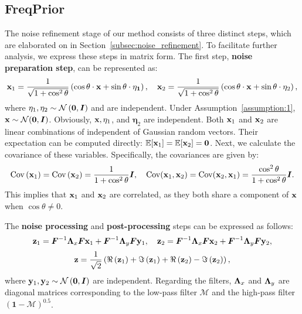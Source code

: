 \subsection{FreqPrior}
\label{appendix:freqprior}
The noise refinement stage of our method consists of three distinct steps, which are elaborated on in Section~\ref{subsec:noise_refinement}.  
To facilitate further analysis, we express these steps in matrix form.
The first step, \textbf{noise preparation step}, can be represented as:
\begin{equation}
\label{eq:freq_x1}
    \mathbf{x}_1 = \frac{1}{\sqrt{1+\cos^2\theta}}\left(\cos\theta\cdot \mathbf{x}+\sin\theta\cdot\mathbf{\eta_1}\right),\quad
    \mathbf{x}_2 = \frac{1}{\sqrt{1+\cos^2\theta}}\left(\cos\theta\cdot \mathbf{x}+\sin\theta\cdot\mathbf{\eta}_2\right),
\end{equation}
where $\mathbf\eta_1, \mathbf\eta_2\sim\mathcal{N}\left(\mathbf{0}, {\bm{I}}\right)$ and are independent. Under Assumption~\ref{assumption:1}, $\mathbf{x}\sim\mathcal{N}(\mathbf{0},{\bm{I}})$. Obviously, $\mathbf{x}, \mathbf\eta_1$, and $\mathbf\eta_2$ are independent.
Both $\mathbf{x}_1$ and $\mathbf{x}_2$ are linear combinations of independent of Gaussian random vectors. 
Their expectation can be computed directly: $\mathbb{E}[\mathbf{x}_1]=\mathbb{E}[\mathbf{x}_2]=\mathbf{0}$.
Next, we calculate the covariance of these variables. Specifically, the covariances are given by:
\begin{equation}
\label{eq:freq_x2}
    \mathrm{Cov}\left(\mathbf{x}_1\right) = \mathrm{Cov}\left(\mathbf{x}_2\right) = \frac{1}{1+\cos^2\theta}{\bm{I}},\quad
    \mathrm{Cov}(\mathbf{x}_1,\mathbf{x}_2) = \mathrm{Cov}(\mathbf{x}_2,\mathbf{x}_1) = \frac{\cos^2\theta}{1+\cos^2\theta}{\bm{I}}.
\end{equation}
This implies that $\mathbf{x}_1$ and $\mathbf{x}_2$ are correlated, as they both share a component of $\mathbf{x}$ when $\cos\theta\ne0$.

The \textbf{noise processing} and \textbf{post-processing} steps can be expressed as follows:
\begin{equation}
    \mathbf{z}_1 = {\bm{F}}^{-1}{\bm{\Lambda}}_x{\bm{F}}\mathbf{x}_1 + {\bm{F}}^{-1}{\bm{\Lambda}}_y{\bm{F}}\mathbf{y}_1, \quad
    \mathbf{z}_2 = {\bm{F}}^{-1}{\bm{\Lambda}}_x{\bm{F}}\mathbf{x}_2 + {\bm{F}}^{-1}{\bm{\Lambda}}_y{\bm{F}}\mathbf{y}_2,
\end{equation}
\begin{equation}
\mathbf{z} = \frac{1}{\sqrt{2}}\left(\Re\left(\mathbf{z}_1\right)+\Im\left(\mathbf{z}_1\right)+\Re\left(\mathbf{z}_2\right)-\Im\left(\mathbf{z}_2\right)\right),
\end{equation}
where $\mathbf{y}_1, \mathbf{y}_2\sim\mathcal{N}\left(\mathbf{0}, {\bm{I}}\right)$ are independent. 
Regarding the filters, ${\bm{\Lambda}}_x$ and ${\bm{\Lambda}}_y$ are diagonal matrices corresponding to the low-pass filter $\mathcal{M}$ and the high-pass filter $(\bm{1}-\mathcal{M})^{0.5}$.

